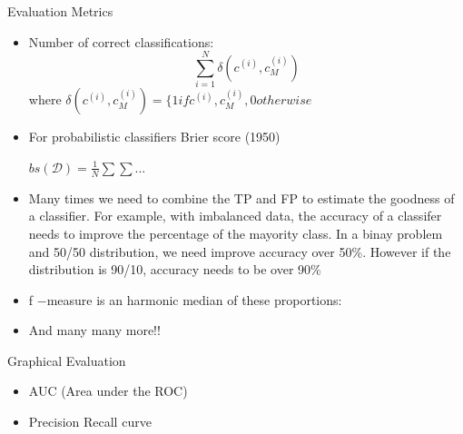 \documentclass{beamer}
\begin{document}
\begin{frame}{Evaluation Metrics}

\begin{itemize}
 \item Number of correct classifications:
    $$\sum^N_{i=1} \delta(c^{(i)}, c^{(i)}_M)$$ where 
    $\delta(c^{(i)}, c^{(i)}_M)=\{1 if c^{(i)}, c^{(i)}_M, 0 otherwise$

  \item For probabilistic classifiers Brier score (1950)

  $bs(\mathcal{D})=\frac{1}{N}\sum \sum...$

  \item Many times we need to combine the TP and FP to estimate the goodness of a classifier. For example, with imbalanced data, the accuracy of a classifer needs to improve the percentage of the mayority class. In a binay problem and 50/50 distribution, we need improve accuracy over 50\%. However if the distribution is 90/10, accuracy needs to be over 90\%

  \item f −measure is an harmonic median of these proportions:

  \item And many many more!!
\end{itemize}


\end{frame}



\begin{frame}{Graphical Evaluation}

\begin{itemize}
  \item AUC (Area under the ROC)

  \item Precision Recall curve\end{itemize}
\end{frame}


\end{document}
